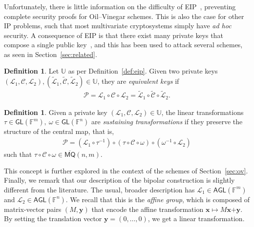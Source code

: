 \documentclass[draft, 12pt, a4paper, oneside]{memoir}
\theoremstyle{definition}
\newtheorem{definition}[theorem]{Definition}
\begin{document}
Unfortunately, there is little information on the difficulty of EIP~\cite[p. 69]{Thomae:201306}, preventing complete security proofs for Oil--Vinegar schemes. This is also the case for other IP problems, such that most multivariate cryptosystems simply have \emph{ad hoc} security. A consequence of EIP is that there exist many private keys that compose a single public key~\cite{Wolf:201104}, and this has been used to attack several schemes, as seen in Section~\ref{sec:related}.

\begin{definition}
  Let $\mathbb{U}$ as per Definition~\ref{def:eip}. Given two private keys $(\mathcal{L}_{1}, \mathcal{C}, \mathcal{L}_{2}), (\widetilde{\mathcal{L}}_{1}, \widetilde{\mathcal{C}}, \widetilde{\mathcal{L}}_{2}) \in \mathbb{U}$, they are \emph{equivalent keys} if
  \begin{align}
    \mathcal{P} = \mathcal{L}_{1} \circ \mathcal{C} \circ \mathcal{L}_{2}
      = \widetilde{\mathcal{L}}_{1} \circ \widetilde{\mathcal{C}} \circ \widetilde{\mathcal{L}}_{2}.
  \end{align}
\end{definition}

\begin{definition}\label{def:sustainer}
  Given a private key $(\mathcal{L}_{1}, \mathcal{C}, \mathcal{L}_{2}) \in \mathbb{U}$, the linear transformations $\tau \in \mathsf{GL}(\mathbb{F}^{m}),\: \omega \in \mathsf{GL}(\mathbb{F}^{n})$ are \emph{sustaining transformations} if they preserve the structure of the central map, that is,
  \begin{align}
    \mathcal{P} = (\mathcal{L}_{1} \circ \tau^{-1}) \circ (\tau \circ \mathcal{C} \circ \omega) \circ (\omega^{-1} \circ \mathcal{L}_{2})
  \end{align}
  such that $\tau \circ \mathcal{C} \circ \omega \in \overline{\mathsf{MQ}}(n, m)$.
\end{definition}

This concept is further explored in the context of the schemes of Section~\ref{sec:ov}. Finally, we remark that our description of the bipolar construction is slightly different from the literature. The usual, broader description has $\mathcal{L}_{1} \in \mathsf{AGL}(\mathbb{F}^{m})$ and $\mathcal{L}_{2} \in \mathsf{AGL}(\mathbb{F}^{n})$. We recall that this is the \emph{affine group}, which is composed of matrix-vector pairs $(M, \mathbf{y})$ that encode the affine transformation $\mathbf{x} \mapsto M\mathbf{x} \bm{+} \mathbf{y}$. By setting the translation vector $\mathbf{y} = (0, \dots, 0)$, we get a linear transformation. 
\end{document}
